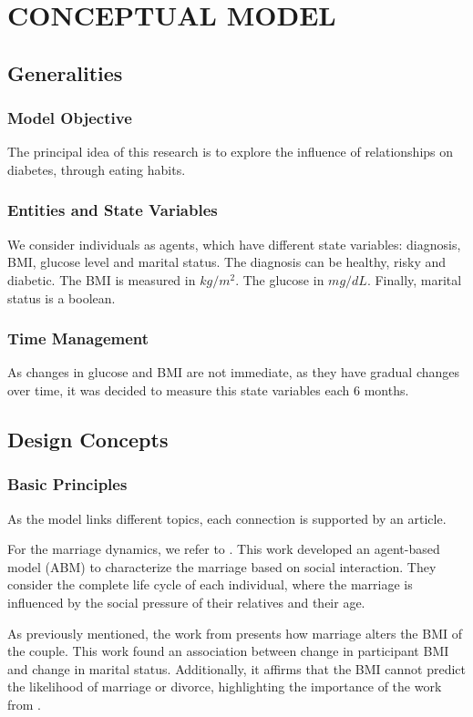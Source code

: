 \section{CONCEPTUAL MODEL}
\subsection{Generalities}
\subsubsection{Model Objective}
The principal idea of this research is to explore the influence of relationships on diabetes, through eating habits.

\subsubsection{Entities and State Variables}
We consider individuals as agents, which have different state variables: diagnosis, BMI, glucose level and marital status. The diagnosis can be healthy, risky and diabetic. The BMI is measured in $kg/m^2$. The glucose in $mg/dL$. Finally, marital status is a boolean.


\subsubsection{Time Management}
As changes in glucose and BMI are not immediate, as they have gradual changes over time, it was decided to measure this state variables each 6 months.

\subsection{Design Concepts}
\subsubsection{Basic Principles}
As the model links different topics, each connection is supported by an article.

For the marriage dynamics, we refer to \cite{billari2007wedding}. This work developed an agent-based model (ABM) to characterize the marriage based on social interaction. They consider the complete life cycle of each individual, where the marriage is influenced by the social pressure of their relatives and their age.

As previously mentioned, the work from \cite{jeffery2002cross} presents how marriage alters the BMI of the couple. This work found an association between change in participant BMI and change in marital status. Additionally, it affirms that the BMI cannot predict the likelihood of marriage or divorce, highlighting the importance of the work from \cite{billari2007wedding}.

